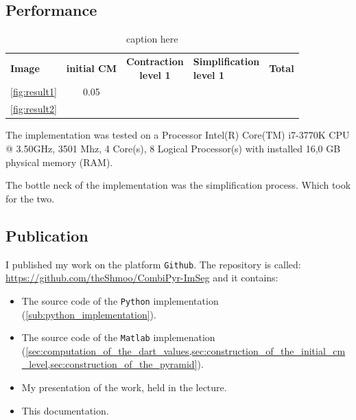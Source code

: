 \documentclass[12pt]{article}
\begin{document}
\subsection{Performance} %
\label{sub:performance}

\begin{table}[tb]
  \caption{caption here}
  \label{tab:tablename}
  \centering

  \begin{tabular}{lcc}
  \toprule
  \textbf{Image} & \textbf{initial CM} & \textbf{Contraction\\ level 1} & \textbf{Simplification\\ level 1} & \textbf{Total}\\
    \cref{fig:result1} & 0.05 & & &\\
    \cref{fig:result2} & & & &\\
  \bottomrule
  \end{tabular}
\end{table}

The implementation was tested on a  Processor Intel(R) Core(TM) i7-3770K CPU @ 3.50GHz, 3501 Mhz, 4 Core(s), 8 Logical Processor(s) with installed 16,0 GB physical memory (RAM).

The bottle neck of the implementation was the simplification process. Which took for the two.


\subsection{Publication} %
\label{sub:publication}

I published my work on the platform \texttt{Github}\cite{github}. The repository is called: \url{https://github.com/theShmoo/CombiPyr-ImSeg} and it contains:
\begin{itemize}
  \item The source code of the \texttt{Python} implementation (\cref{sub:python_implementation}).
  \item The source code of the \texttt{Matlab} implemenation (\cref{sec:computation_of_the_dart_values,sec:construction_of_the_initial_cm_level,sec:construction_of_the_pyramid}).
  \item My presentation of the work, held in the lecture.
  \item This documentation.
\end{itemize}






\end{document}
